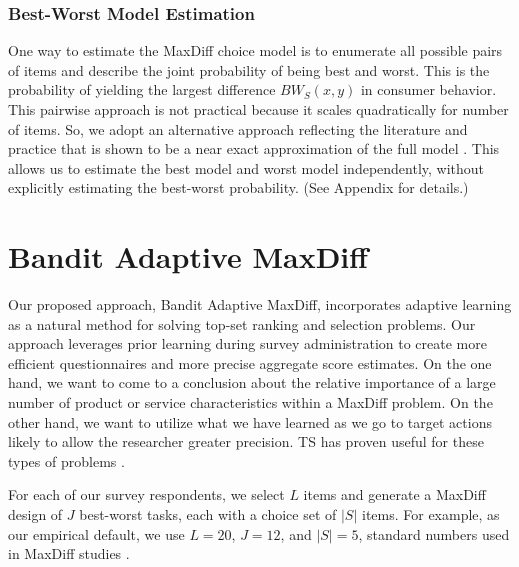 \documentclass[a4paper,11pt]{article}
\newcommand{\numperset}{L}
\begin{document}
\subsubsection{Best-Worst Model Estimation}

One way to estimate the MaxDiff choice model is to enumerate all possible pairs of items and describe the joint probability of being best and worst. This is the probability of yielding the largest difference $BW_S(x,y)$ in consumer behavior. This pairwise approach is not practical because it scales quadratically for number of items. So, we adopt an alternative approach reflecting the literature and practice that is shown to be a near exact approximation of the full model \cite{cohen2003maximum}. This allows us to estimate the best model and worst model independently, without explicitly estimating the best-worst probability. (See Appendix for details.)


\section{Bandit Adaptive MaxDiff}


Our proposed approach, Bandit Adaptive MaxDiff, incorporates adaptive learning as a natural method for solving top-set ranking and selection problems. Our approach leverages prior learning during survey administration to create more efficient questionnaires and more precise aggregate score estimates. On the one hand, we want to come to a conclusion about the relative importance of a large number of product or service characteristics within a MaxDiff problem. On the other hand, we want to utilize what we have learned as we go to target actions likely to allow the researcher greater precision. TS has proven useful for these types of problems \citep{schwartzetal2017,russo2017tutorial}.

For each of our survey respondents, we select $\numperset$ items and generate a MaxDiff design of $J$ best-worst tasks, each with a choice set of $|S|$ items. For example, as our empirical default, we use $\numperset=20$, $J=12$, and $|S|=5$, standard numbers used in MaxDiff studies \citep{wirth2012largeset}. 
\end{document}
